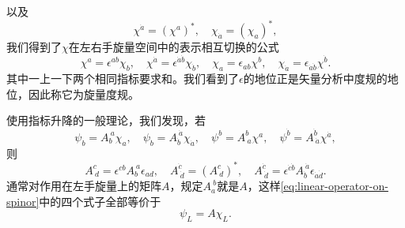 \documentclass[hyperref, UTF8, a4paper]{ctexart}
\begin{document}
以及
\begin{equation}
    \chi^{\dot{a}} = (\chi^a)^*, \quad \chi_{\dot{a}} = (\chi_a)^*,
\end{equation}
我们得到了$\chi$在左右手旋量空间中的表示相互切换的公式
\begin{equation}
    \chi^a = \epsilon^{ab} \chi_b, \quad \chi^{\dot{a}} = \epsilon^{\dot{a} \dot{b}} \chi_{\dot{b}}, \quad \chi_a = \epsilon_{ab} \chi^b, \quad \chi_{\dot{a}} = \epsilon_{\dot{a} \dot{b}} \chi^{\dot{b}}.
\end{equation}
其中一上一下两个相同指标要求和。我们看到了$\epsilon$的地位正是矢量分析中度规的地位，因此称它为旋量度规。

使用指标升降的一般理论，我们发现，若
\begin{equation}
    \psi_b = A_b^{\ a} \chi_a, \quad \psi_{\dot{b}} = A_{\dot{b}}^{\ \dot{a}} \chi_{\dot{a}}, \quad \psi^b = A^b_{\ a} \chi^a, \quad \psi^{\dot{b}} = A^{\dot{b}}_{\ \dot{a}} \chi^{\dot{a}},
    \label{eq:linear-operator-on-spinor}
\end{equation}
则
\begin{equation}
    A^c_{\ d} = \epsilon^{cb} A_{b}^{\ a}\epsilon_{ad}, \quad A^{\dot{c}}_{\ \dot{d}} = (A^c_{\ d})^*, \quad A^{\dot{c}}_{\ \dot{d}} = \epsilon^{\dot{c} \dot{b}} A_{\dot{b}}^{\ \dot{a}} \epsilon_{\dot{a}\dot{d}}.
    \label{eq:left-right-matrix-transform}
\end{equation}
通常对作用在左手旋量上的矩阵$A$，规定$A_a^{\ b}$就是$A$，这样\eqref{eq:linear-operator-on-spinor}中的四个式子全部等价于
\[
    \psi_L = A \chi_L.
\]
\end{document}
